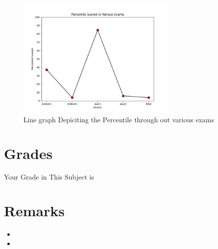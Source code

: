 \documentclass[a4paper,12pt]{article}
\begin{document}
\begin{figure}[th]
    \centering
    \includegraphics[width=0.7\textwidth]{lineGraph.png}
    \caption{Line graph Depiciting the Percentile through out various exams}
\end{figure}

\section*{Grades}
    \textit{}{\Large Your Grade in This Subject is \textbf{}}

\section*{Remarks}
\begin{itemize}
   \item 
   \item 
\end{itemize}
\end{document}
